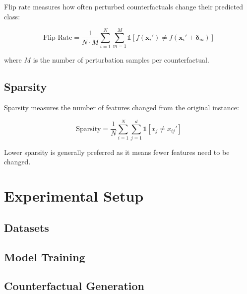 \documentclass{article}
\begin{document}
Flip rate measures how often perturbed counterfactuals change their predicted class:

\begin{equation}
\text{Flip Rate} = \frac{1}{N \cdot M} \sum_{i=1}^{N} \sum_{m=1}^{M} \mathbb{1}[f(\mathbf{x}_i') \neq f(\mathbf{x}_i' + \boldsymbol{\delta}_m)]
\end{equation}

where $M$ is the number of perturbation samples per counterfactual.

\subsection{Sparsity}
\label{subsec:sparsity}

Sparsity measures the number of features changed from the original instance:

\begin{equation}
\text{Sparsity} = \frac{1}{N} \sum_{i=1}^{N} \sum_{j=1}^{d} \mathbb{1}[x_j \neq x_{ij}']
\end{equation}

Lower sparsity is generally preferred as it means fewer features need to be changed.

\section{Experimental Setup}
\label{sec:experimental-setup}

\subsection{Datasets}
\label{subsec:datasets}


\subsection{Model Training}
\label{subsec:model-training}


\subsection{Counterfactual Generation}
\label{subsec:cf-generation}
\end{document}
